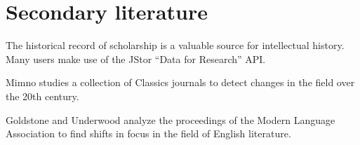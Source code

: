\section{Secondary literature}

The historical record of scholarship is a valuable source for intellectual history. Many users make use of the JStor ``Data for Research'' API.

Mimno \cite{Mimno-12b} studies a collection of Classics journals to detect changes in the field over the 20th century.

Goldstone and Underwood \cite{Goldstone-14} analyze the proceedings of the Modern Language Association to find shifts in focus in the field of English literature.
